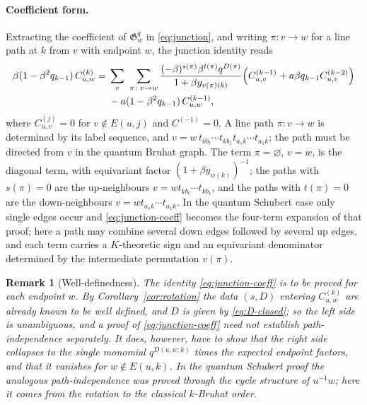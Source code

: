 \documentclass[11pt]{article}
\newtheorem{remark}[proposition]{Remark}
\newcommand{\G}{\mathfrak{G}}
\begin{document}
\paragraph{Coefficient form.}
Extracting the coefficient of $\G_w^q$ in \eqref{eq:junction}, and
writing $\pi\colon v\to w$ for a line path at $k$ from $v$ with
endpoint $w$, the junction identity reads
\begin{equation}\label{eq:junction-coeff}
\begin{split}
 \beta(1-\beta^2q_{k-1})\,C^{(k)}_{u,w}
 ={}&\sum_{v}\ \sum_{\pi\colon v\to w}
     \frac{(-\beta)^{s(\pi)}\beta^{t(\pi)}q^{D(\pi)}}
          {1+\beta y_{v(\pi)(k)}}
     \Bigl(C^{(k-1)}_{u,v}+a\beta q_{k-1}C^{(k-2)}_{u,v}\Bigr)\\
   &-a(1-\beta^2q_{k-1})\,C^{(k-1)}_{u,w},
\end{split}
\end{equation}
where $C^{(j)}_{u,v}=0$ for $v\notin E(u,j)$ and $C^{(-1)}=0$.
A line path $\pi\colon v\to w$ is determined by its label sequence,
and $v=w\,t_{kb_t}\cdots t_{kb_1}t_{a_sk}\cdots t_{a_1k}$; the path
must be directed from $v$ in the quantum Bruhat graph. The term
$\pi=\varnothing$, $v=w$, is the diagonal term, with equivariant
factor $(1+\beta y_{w(k)})^{-1}$; the paths with $s(\pi)=0$ are the
up-neighbours $v=wt_{kb_t}\cdots t_{kb_1}$, and the paths with
$t(\pi)=0$ are the down-neighbours $v=wt_{a_sk}\cdots t_{a_1k}$. In
the quantum Schubert case only single edges occur and
\eqref{eq:junction-coeff} becomes the four-term expansion of that
proof; here a path may combine several down edges followed by several
up edges, and each term carries a $K$-theoretic sign and an
equivariant denominator determined by the intermediate permutation
$v(\pi)$.

\begin{remark}[Well-definedness]\label{rem:well-defined}
The identity \eqref{eq:junction-coeff} is to be proved for each
endpoint $w$. By Corollary~\ref{cor:rotation} the data $(s,D)$
entering $C^{(k)}_{u,w}$ are already known to be well defined, and
$D$ is given by \eqref{eq:D-closed}; so the left side is unambiguous,
and a proof of \eqref{eq:junction-coeff} need not establish
path-independence separately. It does, however, have to show that the
right side collapses to the single monomial $q^{D(u,w;k)}$ times the
expected endpoint factors, and that it vanishes for $w\notin E(u,k)$.
In the quantum Schubert proof the analogous path-independence was
proved through the cycle structure of $u^{-1}w$; here it comes from
the rotation to the classical $k$-Bruhat order.
\end{remark}
\end{document}
